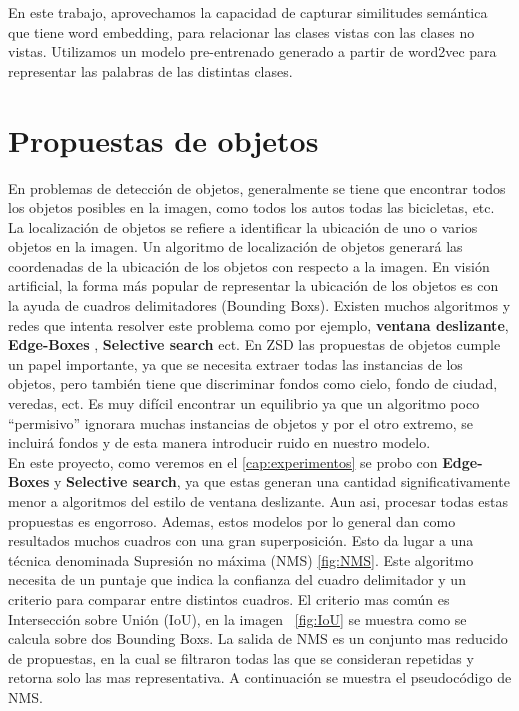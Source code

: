 En este trabajo, aprovechamos la capacidad de capturar similitudes semántica que tiene word embedding, para relacionar las clases vistas con las clases no vistas. Utilizamos un modelo pre-entrenado generado a partir de word2vec para representar las palabras de las distintas clases.\\


\section{Propuestas de objetos}
En problemas de detección de objetos, generalmente se tiene que encontrar todos los objetos posibles en la imagen, como todos los autos todas las bicicletas, etc. La localización de objetos se refiere a identificar la ubicación de uno o varios objetos en la imagen. Un algoritmo de localización de objetos generará las coordenadas de la ubicación de los objetos con respecto a la imagen. En visión artificial, la forma más popular de representar la ubicación de los objetos es con la ayuda de cuadros delimitadores (Bounding Boxs). Existen muchos algoritmos y redes que intenta resolver este problema como por ejemplo, \textbf{ventana deslizante}, \textbf{Edge-Boxes} \cite{zitnick2014edge}, \textbf{Selective search} \cite{uijlings2013selective} ect. En ZSD las propuestas de objetos cumple un papel importante, ya que se necesita extraer todas las instancias de los objetos, pero también tiene que discriminar fondos como cielo, fondo de ciudad, veredas, ect. Es muy difícil encontrar un equilibrio ya que un algoritmo poco ``permisivo'' ignorara muchas instancias de objetos y por el otro extremo, se incluirá fondos y de esta manera introducir ruido en nuestro modelo.\\

En este proyecto, como veremos en el \autoref{cap:experimentos} se probo con \textbf{Edge-Boxes} y \textbf{Selective search}, ya que estas generan una cantidad significativamente menor a algoritmos del estilo de ventana deslizante. Aun asi, procesar todas estas propuestas es engorroso. Ademas, estos modelos por lo general dan como resultados muchos cuadros con una gran superposición. Esto da lugar a una técnica denominada Supresión no máxima (NMS) \ref{fig:NMS}. Este algoritmo necesita de un puntaje que indica la confianza del cuadro delimitador y un criterio para comparar entre distintos cuadros. El criterio mas común es Intersección sobre Unión (IoU), en la imagen ~\ref{fig:IoU} se muestra como se calcula sobre dos Bounding Boxs. La salida de NMS es un conjunto mas reducido de propuestas, en la cual se filtraron todas las que se consideran repetidas y retorna solo las mas representativa. A continuación se muestra el pseudocódigo de NMS.

